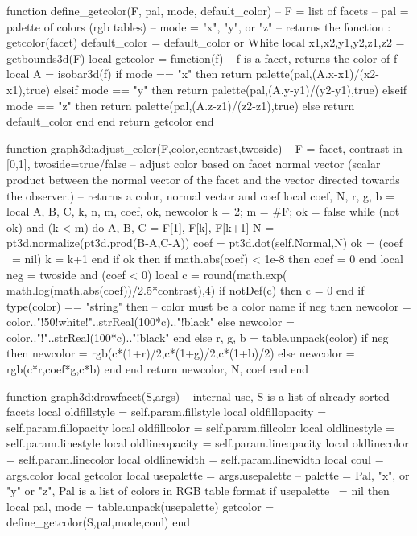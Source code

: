 \documentclass[12pt]{standalone}
\begin{document}
\begin{luacode*}
function define_getcolor(F, pal, mode, default_color)
-- F = list of facets
-- pal = palette of colors (rgb tables)
-- mode = "x", "y", or "z"
-- returns the fonction : getcolor(facet)
    default_color = default_color or White
    local x1,x2,y1,y2,z1,z2 = getbounds3d(F)
    local getcolor = function(f) -- f is a facet, returns the color of f
        local A = isobar3d(f)
        if mode == "x" then return palette(pal,(A.x-x1)/(x2-x1),true)
        elseif mode == "y" then return palette(pal,(A.y-y1)/(y2-y1),true)
        elseif mode == "z" then return palette(pal,(A.z-z1)/(z2-z1),true)
        else return default_color
        end
    end
    return getcolor
end

function graph3d:adjust_color(F,color,contrast,twoside) -- F = facet, contrast in [0,1], twoside=true/false
-- adjust color based on facet normal vector (scalar product between the normal vector of the facet and the vector directed towards the observer.)
-- returns a color, normal vector and coef
    local coef, N, r, g, b = {}
    local A, B, C, k, n, m, coef, ok, newcolor
    k = 2; m = #F; ok = false
    while (not ok) and (k < m) do
        A, B, C = F[1], F[k], F[k+1]
        N = pt3d.normalize(pt3d.prod(B-A,C-A))
        coef = pt3d.dot(self.Normal,N)
        ok = (coef ~= nil)
        k = k+1
    end
    if ok then 
        if math.abs(coef) < 1e-8 then coef = 0 end
        local neg = twoside and (coef < 0)
        local c = round(math.exp( math.log(math.abs(coef))/2.5*contrast),4)
        if notDef(c) then c = 0 end
        if type(color) == "string" then -- color must be a color name
            if neg then
                newcolor = color.."!50!white!"..strReal(100*c).."!black"
            else
                newcolor = color.."!"..strReal(100*c).."!black"
            end
        else 
            r, g, b = table.unpack(color)
            if neg then 
                newcolor = rgb({c*(1+r)/2,c*(1+g)/2,c*(1+b)/2})
            else
                newcolor = rgb({c*r,coef*g,c*b})
            end
        end
        return newcolor, N, coef
    end
end

function graph3d:drawfacet(S,args) -- internal use, S is a list of already sorted facets
    local oldfillstyle = self.param.fillstyle
    local oldfillopacity = self.param.fillopacity
    local oldfillcolor = self.param.fillcolor
    local oldlinestyle = self.param.linestyle
    local oldlineopacity = self.param.lineopacity
    local oldlinecolor = self.param.linecolor
    local oldlinewidth = self.param.linewidth
    local coul = args.color
    local getcolor
    local usepalette = args.usepalette -- palette = {Pal, "x", or "y" or "z"}, Pal is a list of colors in RGB table format
    if usepalette ~= nil then
        local pal, mode = table.unpack(usepalette)
        getcolor = define_getcolor(S,pal,mode,coul)
    end
 

\end{luacode*}
\end{document}
